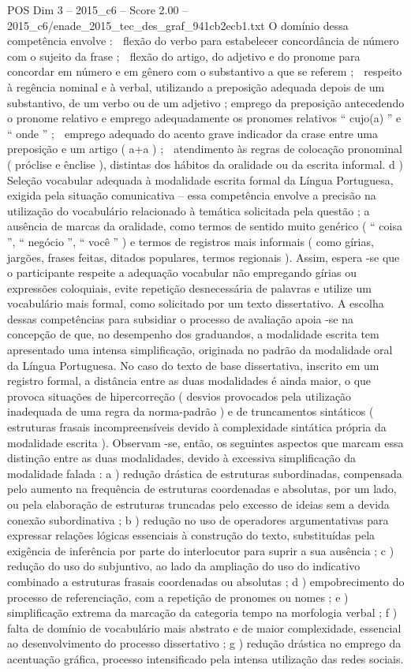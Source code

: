 \begin{textsample}{POS Dim 3 – 2015\_c6 – Score 2.00 – 2015\_c6/enade\_2015\_tec\_des\_graf\_941cb2ecb1.txt}
O domínio dessa competência envolve :  flexão do verbo para estabelecer concordância de número com o sujeito da frase ;  flexão do artigo, do adjetivo e do pronome para concordar em número e em gênero com o substantivo a que se referem ;  respeito à regência nominal e à verbal, utilizando a preposição adequada depois de um substantivo, de um verbo ou de um adjetivo ; emprego da preposição antecedendo o pronome relativo e emprego adequadamente os pronomes relativos “ cujo(a) ” e “ onde ” ;  emprego adequado do acento grave indicador da crase entre uma preposição e um artigo ( a+a ) ;  atendimento às regras de colocação pronominal ( próclise e ênclise ), distintas dos hábitos da oralidade ou da escrita informal. d ) Seleção vocabular adequada à modalidade escrita formal da Língua Portuguesa, exigida pela situação comunicativa – essa competência envolve a precisão na utilização do vocabulário relacionado à temática solicitada pela questão ; a ausência de marcas da oralidade, como termos de sentido muito genérico ( “ coisa ”, “ negócio ”, “ você ” ) e termos de registros mais informais ( como gírias, jargões, frases feitas, ditados populares, termos regionais ).
Assim, espera -se que o participante respeite a adequação vocabular não empregando gírias ou expressões coloquiais, evite repetição desnecessária de palavras e utilize um vocabulário mais formal, como solicitado por um texto dissertativo.
A escolha dessas competências para subsidiar o processo de avaliação apoia -se na concepção de que, no desempenho dos graduandos, a modalidade escrita tem apresentado uma intensa simplificação, originada no padrão da modalidade oral da Língua Portuguesa.
No caso do texto de base dissertativa, inscrito em um registro formal, a distância entre as duas modalidades é ainda maior, o que provoca situações de hipercorreção ( desvios provocados pela utilização inadequada de uma regra da norma-padrão ) e de truncamentos sintáticos ( estruturas frasais incompreensíveis devido à complexidade sintática própria da modalidade escrita ).
Observam -se, então, os seguintes aspectos que marcam essa distinção entre as duas modalidades, devido à excessiva simplificação da modalidade falada : a ) redução drástica de estruturas subordinadas, compensada pelo aumento na frequência de estruturas coordenadas e absolutas, por um lado, ou pela elaboração de estruturas truncadas pelo excesso de ideias sem a devida conexão subordinativa ; b ) redução no uso de operadores argumentativas para expressar relações lógicas essenciais à construção do texto, substituídas pela exigência de inferência por parte do interlocutor para suprir a sua ausência ; c ) redução do uso do subjuntivo, ao lado da ampliação do uso do indicativo combinado a estruturas frasais coordenadas ou absolutas ; d ) empobrecimento do processo de referenciação, com a repetição de pronomes ou nomes ; e ) simplificação extrema da marcação da categoria tempo na morfologia verbal ; f ) falta de domínio de vocabulário mais abstrato e de maior complexidade, essencial ao desenvolvimento do processo dissertativo ; g ) redução drástica no emprego da acentuação gráfica, processo intensificado pela intensa utilização das redes sociais.

\end{textsample}
